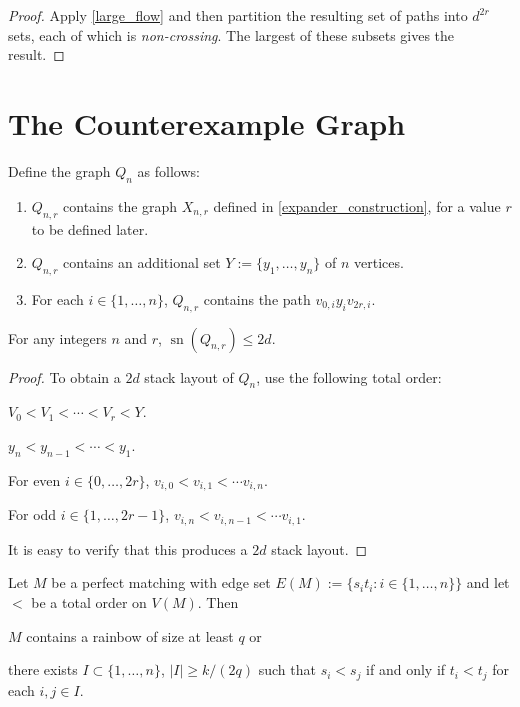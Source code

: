 \documentclass{patmorin}
\DeclareMathOperator{\sn}{sn}
\begin{document}
\begin{proof}
  Apply \cref{large_flow} and then partition the resulting set of paths into $d^{2r}$ sets, each of which is \emph{non-crossing}.  The largest of these subsets gives the result.
\end{proof}


\section{The Counterexample Graph}

Define the graph $Q_n$ as follows:

\begin{enumerate}
  \item $Q_{n,r}$ contains the graph $X_{n,r}$ defined in  \cref{expander_construction}, for a value $r$ to be defined later.
  \item $Q_{n,r}$ contains an additional set $Y:=\{y_1,\ldots,y_n\}$ of $n$ vertices.
  \item For each $i\in\{1,\ldots,n\}$, $Q_{n,r}$ contains the path $v_{0,i}y_iv_{2r,i}$.
\end{enumerate}


\begin{clm}
  For any integers $n$ and $r$, $\sn(Q_{n,r}) \le 2d$.
\end{clm}

\begin{proof}
  To obtain a $2d$ stack layout of $Q_n$, use the following total order:
  \begin{compactenum}
    \item $V_0 < V_1 <\cdots <V_r < Y$.
    \item $y_n < y_{n-1}<\cdots < y_1$.
    \item For even $i\in\{0,\ldots,2r\}$, $v_{i,0} < v_{i,1} < \cdots v_{i,n}$.
    \item For odd $i\in\{1,\ldots,2r-1\}$, $v_{i,n}< v_{i,n-1} < \cdots v_{i,1}$.
  \end{compactenum}
  It is easy to verify that this produces a $2d$ stack layout.
\end{proof}


\begin{lem}\label{rainbow_alternative}
    Let $M$ be a perfect matching with edge set $E(M):=\{s_it_i:i\in\{1,\ldots,n\}\}$ and let $<$ be a total order on $V(M)$.  Then
    \begin{compactenum}[(i)]
        \item $M$ contains a rainbow of size at least $q$ or
        \item there exists $I\subset\{1,\ldots,n\}$, $|I|\ge k/(2q)$ such that $s_i < s_j$ if and only if $t_i< t_j$ for each $i,j\in I$.
    \end{compactenum}
\end{lem}
\end{document}
